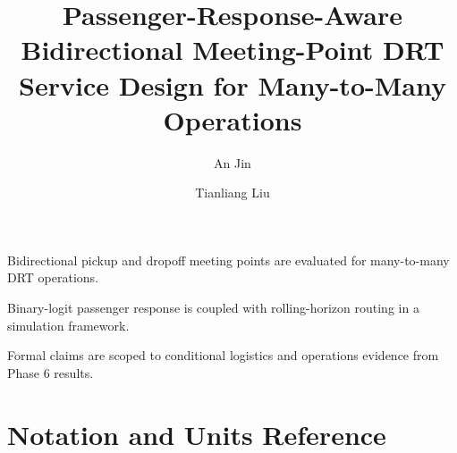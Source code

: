 \documentclass[a4paper,fleqn]{b-els-cas-templates-模版/cas-dc}
\begin{document}
\let\WriteBookmarks\relax
\def\floatpagepagefraction{1}
\def\textpagefraction{.001}


\title[mode=title]{Passenger-Response-Aware Bidirectional Meeting-Point DRT Service Design for Many-to-Many Operations}

\author[1]{An Jin}
\author[1]{Tianliang Liu}
\cormark[1]





\begin{highlights}
\item Bidirectional pickup and dropoff meeting points are evaluated for many-to-many DRT operations.
\item Binary-logit passenger response is coupled with rolling-horizon routing in a simulation framework.
\item Formal claims are scoped to conditional logistics and operations evidence from Phase 6 results.
\end{highlights}

\maketitle












\appendix

\section{Notation and Units Reference}
\label{sec:appendix-notation}
\end{document}
